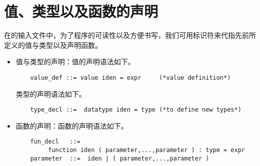 \section{值、类型以及函数的声明}
在\sctlprov{}的输入文件中，为了程序的可读性以及方便书写，我们可用标识符来代指先前所定义的值与类型以及声明函数。

\begin{itemize}
	\item 值与类型的声明：值的声明语法如下。
	\begin{verbatim}
	value_def ::= value iden = expr		(*value definition*)
	\end{verbatim}
	类型的声明语法如下。
	\begin{verbatim}
	type_decl ::=  datatype iden = type (*to define new types*)
	\end{verbatim}
	\item 函数的声明：函数的声明语法如下。
	\begin{verbatim}
	fun_decl   ::=  
	     function iden ( parameter,...,parameter ) : type = expr
	parameter  ::=  iden | ( parameter,...,parameter )
	\end{verbatim}
\end{itemize}

